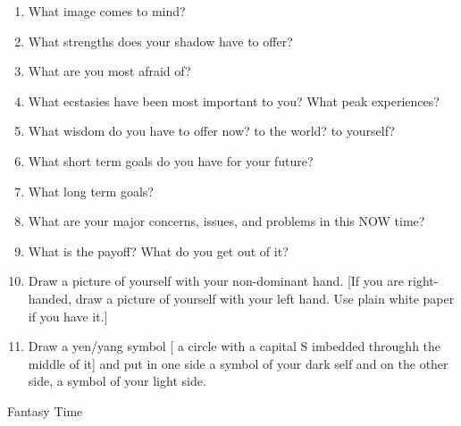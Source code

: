 \begin{enumerate}
	\item What image comes to mind?

	\item What strengths does your shadow have to offer?

	\item What are you most afraid of?

	\item What ecstasies have been most important to you? What peak experiences?

	\item What wisdom do you have to offer now? to the world? to yourself?

	\item What short term goals do you have for your future?

	\item What long term goals?

	\item What are your major concerns, issues, and problems in this NOW time?

	\item What is the payoff? What do you get out of it?

	\item Draw a picture of yourself with your non-dominant hand. [If you are
 right-handed, draw a picture of yourself with your left hand. Use
 plain white paper if you have it.]

	\item Draw a yen/yang symbol [ a circle with a capital S imbedded throughh
 the middle of it] and put in one side a symbol of your dark self and
 on the other side, a symbol of your light side.
\end{enumerate}

\medskip
 Fantasy Time
\medskip

